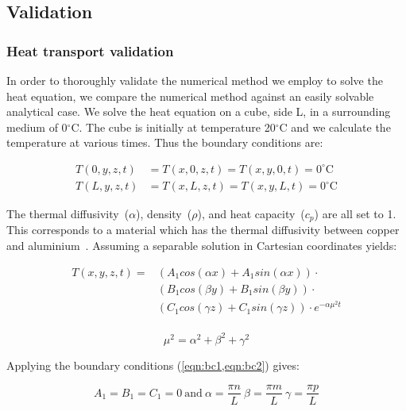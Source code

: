 \subsection{Validation}

\subsubsection*{Heat transport validation}

In order to thoroughly validate the numerical method we employ to solve the heat equation, we compare the numerical method against an easily solvable analytical case. We solve the heat equation on a cube, side L, in a surrounding medium of 0$^{\circ}$C. The cube is initially at temperature 20$^{\circ}$C and we calculate the temperature at various times. Thus the boundary conditions are:

\begin{align}
T(0,y,z,t)&=T(x,0,z,t)=T(x,y,0,t)=0^{\circ}\text{C} \label{eqn:bc1}\\
T(L,y,z,t)&=T(x,L,z,t)=T(x,y,L,t)=0^{\circ}\text{C} \label{eqn:bc2}
\end{align}

The thermal diffusivity~($\alpha$), density~($\rho$), and heat capacity~($c_p$) are all set to 1. This corresponds to a material which has the thermal diffusivity between copper and aluminium~\cite{casalegno2010measurement,maccormack1997measurements}. Assuming a separable solution in Cartesian coordinates yields:

\begin{equation}
\begin{split}
T(x,y,z,t)=&(A_1 cos(\alpha x) + A_1 sin(\alpha x))\cdot\\
&(B_1 cos(\beta y) + B_1 sin(\beta y))\cdot\\
&(C_1 cos(\gamma z) + C_1 sin(\gamma z))\cdot e^{-\alpha\mu^2t}\\
\end{split} 
\end{equation}

\begin{equation}
\mu^2=\alpha^2+\beta^2+\gamma^2
\end{equation}

Applying the boundary conditions (\cref{eqn:bc1,eqn:bc2}) gives:

\begin{equation}
A_1=B_1=C_1=0\
\text{and}\ \alpha=\frac{\pi n}{L}\ \beta=\frac{\pi m}{L}\ \gamma=\frac{\pi p}{L}
\end{equation}

